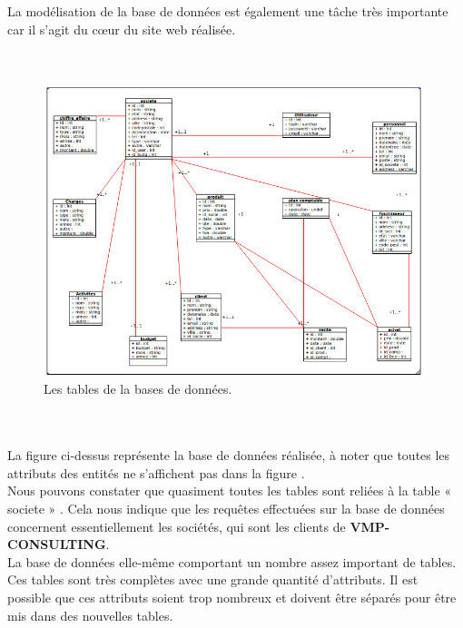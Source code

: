 \documentclass[12pt]{article}
\begin{document}
La modélisation de la base de données est également une tâche très importante car il s’agit
du cœur du site web réalisée. \\ 


\\ \\

\begin{center}
\begin{figure}[htp]
  \centering
  \includegraphics[width=12cm]{bd1.png}
  \caption{Les tables de la bases de données.}
  \label{fig:une-autre-image}
\end{figure}

\end{center}
\\ \\

La figure ci-dessus représente la base de données réalisée, à noter que toutes les attributs des entités  ne s'affichent pas dans la figure .\\ Nous pouvons constater que quasiment toutes les tables sont reliées à la table « societe » . Cela nous indique que les requêtes effectuées sur la base de données concernent essentiellement les sociétés, qui sont les clients de \textbf{VMP-CONSULTING}.\\
La base de données elle-même comportant un nombre assez important de tables.\\
Ces tables sont  très complètes avec une grande quantité d’attributs. Il est possible que
ces attributs soient trop nombreux et doivent être séparés pour être mis dans des nouvelles
tables.\\
\end{document}

